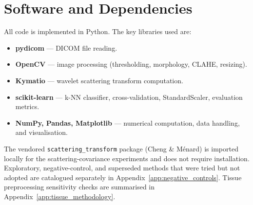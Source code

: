\chapter{Software and Dependencies}

All code is implemented in Python. The key libraries used are:

\begin{itemize}
    \item \textbf{pydicom} \cite{pydicom2024} --- DICOM file reading.
    \item \textbf{OpenCV} \cite{bradski2000opencv} --- image processing (thresholding, morphology, CLAHE, resizing).
    \item \textbf{Kymatio} \cite{andreux2020kymatio} --- wavelet scattering transform computation.
    \item \textbf{scikit-learn} \cite{pedregosa2011scikit} --- k-NN classifier, cross-validation, StandardScaler, evaluation metrics.
    \item \textbf{NumPy, Pandas, Matplotlib} --- numerical computation, data handling, and visualisation.
\end{itemize}

The vendored \texttt{scattering\_transform} package (Cheng \& M\'enard) is imported locally for the scattering-covariance experiments and does not require installation. Exploratory, negative-control, and superseded methods that were tried but not adopted are catalogued separately in Appendix~\ref{app:negative_controls}. Tissue preprocessing sensitivity checks are summarised in Appendix~\ref{app:tissue_methodology}.
